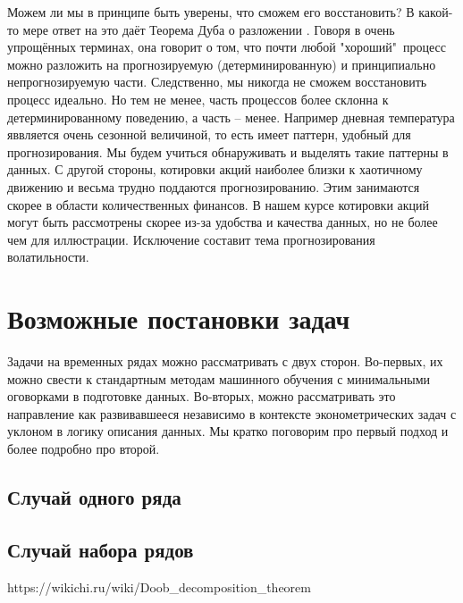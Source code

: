 \documentclass[12pt,fleqn]{article}
\begin{document}
Можем ли мы в принципе быть уверены, что сможем его восстановить? В какой-то мере ответ на это даёт Теорема Дуба о разложении \cite{doob}. Говоря в очень упрощённых терминах, она говорит о том, что почти любой "хороший"\ процесс можно разложить на прогнозируемую (детерминированную) и принципиально непрогнозируемую части. Следственно, мы никогда не сможем восстановить процесс идеально. Но тем не менее, часть процессов более склонна к детерминированному поведению, а часть -- менее. Например дневная температура яввляется очень сезонной величиной, то есть имеет паттерн, удобный для прогнозирования. Мы будем учиться обнаруживать и выделять такие паттерны в данных. С другой стороны, котировки акций наиболее близки к хаотичному движению и весьма трудно поддаются прогнозированию. Этим занимаются скорее в области количественных финансов. В нашем курсе котировки акций могут быть рассмотрены скорее из-за удобства и качества данных, но не более чем для иллюстрации. Исключение составит тема прогнозирования волатильности.




\section{Возможные постановки задач}

Задачи на временных рядах можно рассматривать с двух сторон. Во-первых, их можно свести к стандартным методам машинного обучения с минимальными оговорками в подготовке данных. Во-вторых, можно рассматривать это направление как развивавшееся независимо в контексте эконометрических задач с уклоном в логику описания данных. Мы кратко поговорим про первый подход и более подробно про второй.

\subsection{Случай одного ряда}
\subsection{Случай набора рядов}

\begin{thebibliography}{1}
	https://wikichi.ru/wiki/Doob\_decomposition\_theorem
\end{thebibliography}
\end{document}
